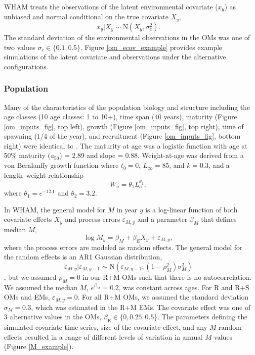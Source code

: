 \documentclass[
  12pt,
]{article}
\begin{document}
WHAM treats the observations of the latent environmental covariate
(\(x_y\)) as unbiased and normal conditional on the true covariate
\(X_y\), \[
x_y|X_y \sim \text{N}\left(X_y,\sigma^2_e\right).
\] The standard deviation of the environmental observations in the OMs
was one of two values \(\sigma_e \in \{0.1, 0.5\}\). Figure
\ref{om_ecov_example} provides example simulations of the latent
covariate and observations under the alternative configurations.

\subsubsection*{Population}\label{population}

Many of the characteristics of the population biology and structure
including the age classes (10 age classes: 1 to 10+), time span (40
years), maturity (Figure \ref{om_inputs_fig}, top left), growth (Figure
\ref{om_inputs_fig}, top right), time of spawning (1/4 of the year), and
recruitment (Figure \ref{om_inputs_fig}, bottom right) were identical to
\citet{milleretal26}. The maturity at age was a logistic function with
age at 50\% maturity (\(a_{50}\)) = 2.89 and slope = 0.88. Weight-at-age
was derived from a von Beralanffy growth function where \(t_0 = 0\),
\(L_\infty = 85\), and \(k = 0.3\), and a length--weight relationship \[
W_a = \theta_1 L_a^{\theta_2},
\] where \(\theta_1 = e^{-12.1}\) and \(\theta_2 = 3.2\).

In WHAM, the general model for \(M\) in year \(y\) is a log-linear
function of both covariate effects \(X_y\) and process errors
\(\varepsilon_{M,y}\) and a parameter \(\beta_{M}\) that defines median
\(M\), \[
\log M_y = \beta_M + \beta_{E} X_y + \varepsilon_{M,y},
\] where the process errors are modeled as random effects. The general
model for the random effects is an AR1 Gaussian distribution, \[
\varepsilon_{M,y}|\varepsilon_{M,y-1} \sim \text{N}\left(\varepsilon_{M,y-1},(1-\rho_M^2)\sigma_M^2\right)
\] \citep{stockmiller21}, but we assumed \(\rho_M = 0\) in our R+M OMs
such that there is no autocorrelation. We assumed the median \(M\),
\(e^{\beta_M} = 0.2\), was constant across ages. For R and R+S OMs and
EMs, \(\varepsilon_{M,y} = 0\). For all R+M OMs, we assumed the standard
deviation \(\sigma_M = 0.3\), which was estimated in the R+M EMs. The
covariate effect was one of 3 alternative values in the OMs,
\(\beta_\text{E} \in \{0,0.25,0.5\}\). The parameters defining the
simulated covariate time series, size of the covariate effect, and any
\(M\) random effects resulted in a range of different levels of
variation in annual \(M\) values (Figure \ref{M_example}).
\end{document}
